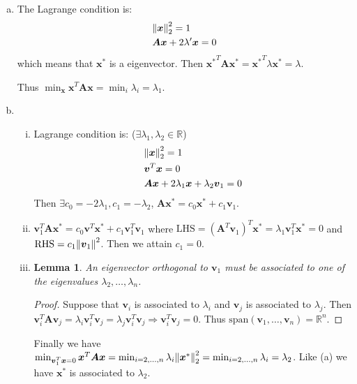 \documentclass{article}
\def\RR{\mathbb{R}}
\def\bv{\boldsymbol{v}}
\def\bx{\boldsymbol{x}}
\def\bA{\boldsymbol{A}}
\newtheorem{lemma}{Lemma}
\begin{document}
\begin{enumerate}[(a)]
	\item
		The Lagrange condition is:
		\[
		    \begin{aligned}
				&\norm{\bx}^2_2=1
				\\&
				\bA\bx+2\lambda'\bx=0
		    \end{aligned}
		\]
		which means that $\bx^*$ is a eigenvector.
		Then ${\bx^*}^T\bA\bx^*={\bx^*}^T\lambda\bx^*=\lambda$.

		Thus $\min_{\bx}\bx^T\bA\bx=\min_i\lambda_i=\lambda_1$.
	\item
		\begin{enumerate}[i)]
			\item 
				Lagrange condition is: ($\exists \lambda_1,\lambda_2\in\RR$)
				\[
				    \begin{aligned}
				        &\norm{\bx}^2_2=1
						\\&
						\bv^T\bx=0
						\\&
						\bA\bx+2\lambda_1\bx+\lambda_2\bv_1=0
				    \end{aligned}
				\]
				Then $\exists c_0=-2\lambda_1,c_1=-\lambda_2$, $\bA\bx^*=c_0\bx^*+c_1\bv_1$.
			\item
				$\bv_1^T\bA\bx^*=c_0\bv^T\bx^*+c_1\bv_1^T\bv_1$ where $\mbox{LHS}=(\bA^T\bv_1)^T\bx^*=\lambda_1\bv_1^T\bx^*=0$ and $\mbox{RHS}=c_1\norm{\bv_1}^2$.
				Then we attain $c_1=0$.
			\item
				\begin{lemma}
					An eigenvector orthogonal to $\bv_1$ must be associated to one of the eigenvalues $\lambda_2,\dots,\lambda_n$.
				\end{lemma}
				\begin{proof}
					Suppose that $\bv_i$ is associated to $\lambda_i$ and $\bv_j$ is associated to $\lambda_j$.
					Then $\bv_i^T\bA\bv_j=\lambda_i\bv_i^T\bv_j=\lambda_j\bv_i^T\bv_j\Rightarrow\bv_i^T\bv_j=0$. Thus $\mbox{span}{(\bv_1,\dots,\bv_n)}=\RR^n$.
				\end{proof}

				Finally we have $\min_{\bv_1^T\bx=0}\bx^T\bA\bx=\min_{i=2,\dots,n}\lambda_i\norm{\bx^*}_2^2=\min_{i=2,\dots,n}\lambda_i=\lambda_2$. Like (a) we have $\bx^*$ is associated to $\lambda_2$.
		\end{enumerate}
\end{enumerate}
\end{document}
